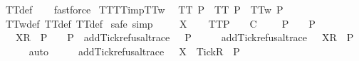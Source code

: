 \ TT{}{\isacharunderscore}def\isanewline
\ \ \isamarkupfalse%
\ fastforce%
\endisatagproof
{\isafoldproof}%
%
\isadelimproof
\isanewline
%
\endisadelimproof
\isanewline
{}\isamarkupfalse%
\ TT{}{\isacharunderscore}TT{}{\isacharunderscore}imp{\isacharunderscore}TT{}w{\isacharcolon}\isanewline
\ \ {\isachardoublequoteopen}TT{}\ P\ {\isasymLongrightarrow}\ TT{}\ P\ {\isasymLongrightarrow}\ TT{}w\ P{\isachardoublequoteclose}\isanewline
%
\isadelimproof
\ \ %
\endisadelimproof
%
\isatagproof
{}\isamarkupfalse%
\ TT{}w{\isacharunderscore}def\ TT{}{\isacharunderscore}def\ TT{}{\isacharunderscore}def\isanewline
{}\isamarkupfalse%
\ {\isacharparenleft}safe{\isacharcomma}\ simp{\isacharparenright}\isanewline
\ \ \isamarkupfalse%
\ {\isasymrho}\ X\isanewline
\ \ \isamarkupfalse%
\ TT{}{\isacharunderscore}P{\isacharcolon}\ {\isachardoublequoteopen}{\isasymforall}{\isasymrho}{\isachardot}\ {\isacharparenleft}{\isasymexists}{\isasymsigma}{\isachardot}\ {\isasymrho}\ {\isasymlesssim}\isactrlsub C\ {\isasymsigma}\ {\isasymand}\ {\isasymsigma}\ {\isasymin}\ P{\isacharparenright}\ {\isasymlongrightarrow}\ {\isasymrho}\ {\isasymin}\ P{\isachardoublequoteclose}\isanewline
\ \ \isamarkupfalse%
\ {\isachardoublequoteopen}{\isasymrho}\ {\isacharat}\ {\isacharbrackleft}{\isacharbrackleft}X{\isacharbrackright}\isactrlsub R{\isacharbrackright}\ {\isasymin}\ P{\isachardoublequoteclose}\ {\isachardoublequoteopen}{\isasymforall}{\isasymrho}{\isachardot}\ {\isasymrho}\ {\isasymin}\ P\ {\isasymlongrightarrow}\ add{\isacharunderscore}Tick{\isacharunderscore}refusal{\isacharunderscore}trace\ {\isasymrho}\ {\isasymin}\ P{\isachardoublequoteclose}\isanewline
\ \ \isamarkupfalse%
\ \isamarkupfalse%
\ {\isachardoublequoteopen}add{\isacharunderscore}Tick{\isacharunderscore}refusal{\isacharunderscore}trace\ {\isacharparenleft}{\isasymrho}\ {\isacharat}\ {\isacharbrackleft}{\isacharbrackleft}X{\isacharbrackright}\isactrlsub R{\isacharbrackright}{\isacharparenright}\ {\isasymin}\ P{\isachardoublequoteclose}\isanewline
\ \ \ \ \isamarkupfalse%
\ auto\isanewline
\ \ \isamarkupfalse%
\ \isamarkupfalse%
\ {\isachardoublequoteopen}add{\isacharunderscore}Tick{\isacharunderscore}refusal{\isacharunderscore}trace\ {\isasymrho}\ {\isacharat}\ {\isacharbrackleft}{\isacharbrackleft}X\ {\isasymunion}\ {\isacharbraceleft}Tick{\isacharbraceright}{\isacharbrackright}\isactrlsub R{\isacharbrackright}\ {\isasymin}\ P{\isachardoublequoteclose}\isanewline

